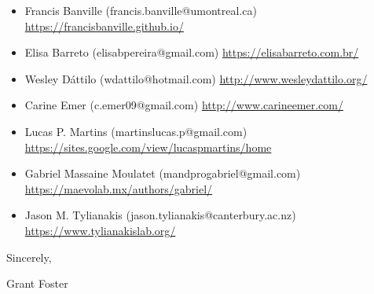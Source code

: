 \documentclass{article}
\begin{document}
\begin{itemize}
    \item Francis Banville (francis.banville@umontreal.ca) \url{https://francisbanville.github.io/}
    \item Elisa Barreto (elisabpereira@gmail.com) \url{https://elisabarreto.com.br/}
    \item Wesley Dáttilo (wdattilo@hotmail.com) \url{http://www.wesleydattilo.org/}
    \item Carine Emer (c.emer09@gmail.com) \url{http://www.carineemer.com/}    
    \item Lucas P. Martins (martinslucas.p@gmail.com) \url{https://sites.google.com/view/lucaspmartins/home}
    \item Gabriel Massaine Moulatet (mandprogabriel@gmail.com) \url{https://maevolab.mx/authors/gabriel/}
    \item Jason M. Tylianakis (jason.tylianakis@canterbury.ac.nz) \url{https://www.tylianakislab.org/}
\end{itemize}

\bigskip %

Sincerely,


Grant Foster
\end{document}
